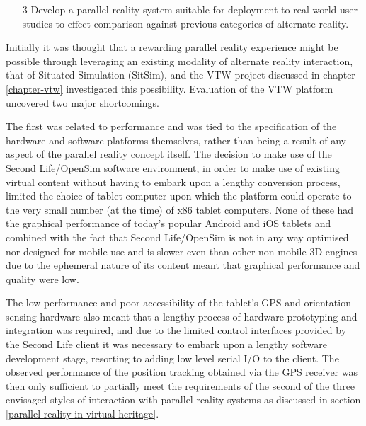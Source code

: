 \begin{enumerate}
	\item[3] Develop a parallel reality system suitable for deployment to real world user studies to effect comparison against previous categories of alternate reality.
\end{enumerate}

Initially it was thought that a rewarding parallel reality experience might be possible through leveraging an existing modality of alternate reality interaction, that of Situated Simulation (SitSim), and the VTW project discussed in chapter \ref{chapter-vtw} investigated this possibility. Evaluation of the VTW platform uncovered two major shortcomings.

The first was related to performance and was tied to the specification of the hardware and software platforms themselves, rather than being a result of any aspect of the parallel reality concept itself. The decision to make use of the Second Life/OpenSim software environment, in order to make use of existing virtual content without having to embark upon a lengthy conversion process, limited the choice of tablet computer upon which the platform could operate to the very small number (at the time) of x86 tablet computers. None of these had the graphical performance of today's popular Android and iOS tablets and combined with the fact that Second Life/OpenSim is not in any way optimised nor designed for mobile use and is slower even than other non mobile 3D engines due to the ephemeral nature of its content meant that graphical performance and quality were low.

The low performance and poor accessibility of the tablet's GPS and orientation sensing hardware also meant that a lengthy process of hardware prototyping and integration was required, and due to the limited control interfaces provided by the Second Life client it was necessary to embark upon a lengthy software development stage, resorting to adding low level serial I/O to the client. The observed performance of the position tracking obtained via the GPS receiver was then only sufficient to partially meet the requirements of the second of the three envisaged styles of interaction with parallel reality systems as discussed in section \ref{parallel-reality-in-virtual-heritage}.

